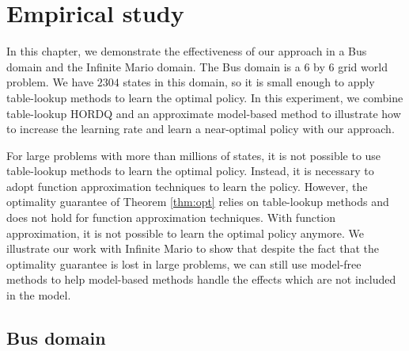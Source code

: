 
\chapter{Empirical study}

In this chapter, we demonstrate the effectiveness of our approach in
a Bus domain and the Infinite Mario domain.
The Bus domain is a 6 by 6 grid world problem. 
We have $2304$ states in this domain, so it is small enough to apply table-lookup methods to learn
the optimal policy. In this experiment, we combine table-lookup HORDQ and an approximate model-based method 
to illustrate how to increase the learning rate and learn a near-optimal policy with our approach.

For large problems with more than millions of states, it is not possible to use table-lookup methods to learn the optimal policy.
Instead, it is necessary to adopt function approximation techniques to learn the policy.
However, the optimality guarantee of Theorem \ref{thm:opt} relies on table-lookup methods and 
does not hold for function approximation techniques.
With function approximation, it is not possible to learn the optimal policy anymore.
We illustrate our work with Infinite Mario to show that despite the fact that the optimality guarantee is lost in
large problems, we can still use model-free methods to help model-based methods handle the effects which
are not included in the model. 



\section{Bus domain}
\label{se:domain}

